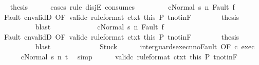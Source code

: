 \begin{isabellebody}
\ \isamarkupfalse%
\ {\isacharquery}thesis\isanewline
\ \ \ \ \isamarkupfalse%
\ {\isacharparenleft}cases\ rule{\isacharcolon}\ disjE\ {\isacharbrackleft}consumes\ {}{\isacharbrackright}{\isacharparenright}\isanewline
\ \ \ \ \ \ \isamarkupfalse%
\ {\isachardoublequoteopen}{\isasymGamma}{\isasymturnstile}{\isasymlangle}cNormal\ s{\isasymrangle}\ {\isacharequal}n{\isasymRightarrow}\ Fault\ f{\isachardoublequoteclose}\isanewline
\ \ \ \ \ \ \isamarkupfalse%
\ Fault\ cnvalidD\ {\isacharbrackleft}OF\ valid{\isacharunderscore}c{}\ {\isacharbrackleft}rule{\isacharunderscore}format{\isacharbrackright}\ ctxt\ this\ P{\isacharbrackright}\ t{\isacharunderscore}notin{\isacharunderscore}F\isanewline
\ \ \ \ \ \ \isamarkupfalse%
\ {\isacharquery}thesis\isanewline
\ \ \ \ \ \ \ \ \isamarkupfalse%
\ blast\isanewline
\ \ \ \ \isamarkupfalse%
\isanewline
\ \ \ \ \ \ \isamarkupfalse%
\ {\isachardoublequoteopen}{\isasymGamma}{\isasymturnstile}{\isasymlangle}cNormal\ s{\isasymrangle}\ {\isacharequal}n{\isasymRightarrow}\ Fault\ f{\isachardoublequoteclose}\isanewline
\ \ \ \ \ \ \isamarkupfalse%
\ Fault\ cnvalidD\ {\isacharbrackleft}OF\ valid{\isacharunderscore}c{}\ {\isacharbrackleft}rule{\isacharunderscore}format{\isacharbrackright}\ ctxt\ this\ P{\isacharbrackright}\ t{\isacharunderscore}notin{\isacharunderscore}F\isanewline
\ \ \ \ \ \ \isamarkupfalse%
\ {\isacharquery}thesis\isanewline
\ \ \ \ \ \ \ \ \isamarkupfalse%
\ blast\isanewline
\ \ \ \ \isamarkupfalse%
\isanewline
\ \ \isamarkupfalse%
\isanewline
\ \ \ \ \isamarkupfalse%
\ Stuck\isanewline
\ \ \ \ \isamarkupfalse%
\ inter{\isacharunderscore}guards{\isacharunderscore}execn{\isacharunderscore}noFault\ {\isacharbrackleft}OF\ c\ exec{\isacharbrackright}\isanewline
\ \ \ \ \isamarkupfalse%
\ {\isachardoublequoteopen}{\isasymGamma}{\isasymturnstile}{\isasymlangle}cNormal\ s{\isasymrangle}\ {\isacharequal}n{\isasymRightarrow}\ t{\isachardoublequoteclose}\ \isamarkupfalse%
\ simp\isanewline
\ \ \ \ \isamarkupfalse%
\ valid{\isacharunderscore}c{}\ {\isacharbrackleft}rule{\isacharunderscore}format{\isacharbrackright}\ ctxt\ this\ P\ t{\isacharunderscore}notin{\isacharunderscore}F\isanewline

\end{isabellebody}
